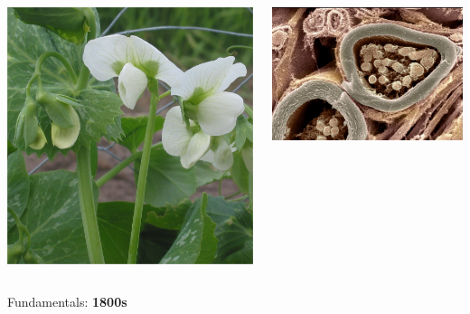 {\begin{frame}
    \begin{columns}
        \begin{column}{0.43\textwidth}
            \includegraphics[width=\textwidth]{figures/Doperwt_rijserwt_bloemen_Pisum_sativum.jpg}
        \end{column}
        \begin{column}{0.57\textwidth}
            \includegraphics[width=\textwidth]{figures/myelin.jpg}
        \end{column}
    \end{columns}

\begin{center}
    Fundamentals: \textbf{1800s}
\end{center}

\end{frame}
}




